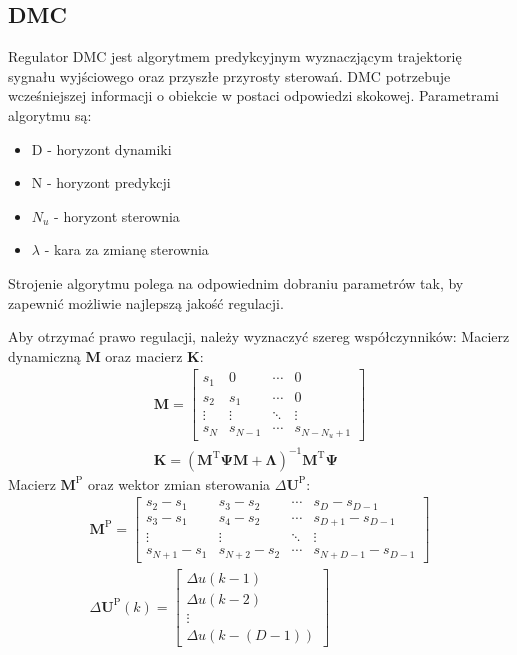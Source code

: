 \subsection{DMC}
Regulator DMC jest algorytmem predykcyjnym wyznaczjącym trajektorię sygnału wyjściowego oraz przyszłe przyrosty sterowań. DMC potrzebuje wcześniejszej informacji o obiekcie w postaci odpowiedzi skokowej. Parametrami algorytmu są:
\begin{itemize}
    \item D - horyzont dynamiki
    \item N - horyzont predykcji
    \item $N_u$ - horyzont sterownia
    \item $\lambda$ - kara za zmianę sterownia
\end{itemize}

Strojenie algorytmu polega na odpowiednim dobraniu parametrów tak, by zapewnić możliwie najlepszą jakość regulacji.

\par Aby otrzymać prawo regulacji, należy wyznaczyć szereg współczynników:
\newline Macierz dynamiczną \textbf{M} oraz macierz \textbf{K}:
\begin{gather}
       \mathbf{M} = \begin{bmatrix}
            s_1 & 0 & \cdots & 0\\
            s_2 & s_1 & \cdots & 0\\
            \vdots & \vdots & \ddots & \vdots \\
            s_N & s_{N-1} & \cdots & s_{N-N_u+1}
        \end{bmatrix} \\
         \mathbf{K} = (\mathbf{M}^\textrm{T} \mathbf{\Psi} \mathbf{M }+ \mathbf{\Lambda})^{-1} \mathbf{M}^\textrm{T}\mathbf{ \Psi} 
\end{gather}
\newline Macierz $\mathbf{M}^\textrm{P}$ oraz wektor zmian sterowania $\Delta \mathbf{U}^\textrm{P}$:
\begin{gather}
        \mathbf{M}^\textrm{P} = \begin{bmatrix}
            s_2-s_1 & s_3-s_2 & \cdots & s_D-s_{D-1}\\
            s_3-s_1 & s_4-s_2 & \cdots & s_{D+1}-s_{D-1}\\
            \vdots & \vdots & \ddots & \vdots \\
            s_{N+1}-s_1 & s_{N+2}-s_2 & \cdots & s_{N+D-1}-s_{D-1}
        \end{bmatrix} \\
         \Delta \mathbf{U}^\textrm{P}(k) = \begin{bmatrix}
            \Delta u(k-1)\\
            \Delta u(k-2)\\
            \vdots\\
            \Delta u(k-(D-1))
        \end{bmatrix}
\end{gather}

